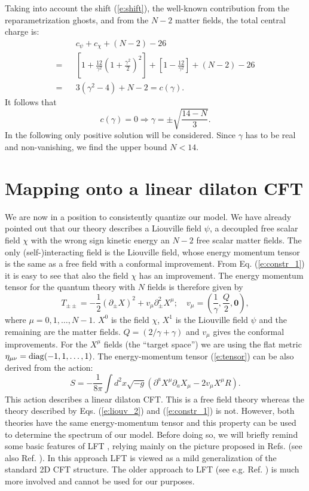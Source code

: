 \documentclass[a4paper,aps,prd,twocolumn,groupedaddress]{revtex4}
\begin{document}
Taking into account the shift (\ref{e:shift}), the well-known
contribution from the reparametrization ghosts, and from the $N-2$
matter fields, the total central charge is:
\begin{eqnarray*}
&& c_\psi + c_\chi +(N-2)-26  \\ = &&\left[1
+\frac{12}{\gamma^2}\left(1+\frac{\gamma^2}{2}\right)^2 \right] +
\left[ 1-\frac{12}{\gamma^2} \right] +(N-2)-26  \\
= && 3(\gamma^2-4)+N-2 = c(\gamma).
\end{eqnarray*}
It follows that
\begin{equation}\label{e:anomalia}
c(\gamma)=0 \Rightarrow \gamma=\pm\sqrt{\frac{14-N}{3}}.
\end{equation}
In the following only positive solution will be considered. Since
$\gamma$ has to be real and non-vanishing, we find the upper bound
$N<14$.

\section{Mapping onto a linear dilaton CFT}
We are now in a position to consistently quantize our model. We have
already pointed out that our theory describes a Liouville field
$\psi$, a decoupled free scalar field $\chi$ with the wrong sign
kinetic energy an $N-2$ free scalar matter fields. The only
(self-)interacting field is the Liouville field, whose energy momentum
tensor is the same as a free field with a conformal improvement.  From
Eq. (\ref{e:constr_1}) it is easy to see that also the field $\chi$
has an improvement. The
energy momentum tensor for the quantum theory with $N$ fields is
therefore given by
\begin{equation}\label{e:tensor}
T_{\pm \pm}= -\frac{1}{2}(\partial_\pm X)^2 +v_\mu\partial_\pm^2 X^\mu;
\quad v_\mu = \left( \frac{1}{\gamma},\frac{Q}{2},\mathbf{0}\right),
\end{equation}
where $\mu=0,1,\ldots,N-1$.  $X^0$ is the  field $\chi$, $X^1$ is
the Liouville field $\psi$ and the remaining are the matter
fields. $Q=(2/\gamma + \gamma)$ and $v_\mu$ gives the conformal
improvements. For the $X^\mu$ fields (the ``target space'') we are
using the flat metric $\eta_{\mu\nu} = { \rm diag}(-1,1,\ldots,1)$.  The
energy-momentum tensor (\ref{e:tensor}) can be also derived from the
action:
\begin{equation}\label{e:dilat}
S=-\frac{1}{8\pi}\int d^2 x\sqrt{-g}\left( \partial^a X^\mu\partial_a
X_\mu -2v_\mu X^\mu R\right).
\end{equation}
This action describes a linear dilaton CFT. This is a free field
theory whereas the theory described by Eqs. (\ref{e:liouv_2}) and
(\ref{e:constr_1}) is not. However, both theories have the same
energy-momentum tensor and this property can be used to determine the
spectrum of our model.  Before doing so, we will briefly remind some
basic features of LFT \cite{thorn,bra}, relying mainly on the picture
proposed in Refs. \cite{do,zz} (see also Ref. \cite{tesc}).  In this
approach LFT is viewed as a mild generalization of the standard 2D CFT
structure. The older approach to LFT (see e.g. Ref. \cite{seib}) is
much more involved and cannot be used for our purposes.
\end{document}

